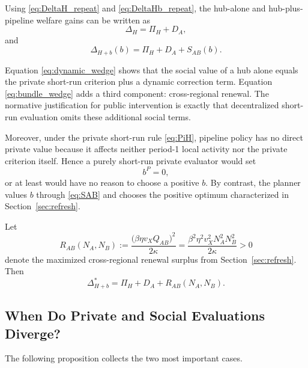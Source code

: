 Using \eqref{eq:DeltaH_repeat} and \eqref{eq:DeltaHb_repeat}, the hub-alone and hub-plus-pipeline welfare gains can be written as
\begin{equation}
\Delta_H
=
\Pi_H + D_A,
\label{eq:dynamic_wedge}
\end{equation}
and
\begin{equation}
\Delta_{H+b}(b)
=
\Pi_H + D_A + S_{AB}(b).
\label{eq:bundle_wedge}
\end{equation}

Equation \eqref{eq:dynamic_wedge} shows that the social value of a hub alone equals the private short-run criterion plus a dynamic correction term. Equation \eqref{eq:bundle_wedge} adds a third component: cross-regional renewal. The normative justification for public intervention is exactly that decentralized short-run evaluation omits these additional social terms.

Moreover, under the private short-run rule \eqref{eq:PiH}, pipeline policy has no direct private value because it affects neither period-1 local activity nor the private criterion itself. Hence a purely short-run private evaluator would set
\[
b^{P}=0,
\]
or at least would have no reason to choose a positive $b$. By contrast, the planner values $b$ through \eqref{eq:SAB} and chooses the positive optimum characterized in Section~\ref{sec:refresh}.

Let
\begin{equation}
R_{AB}(N_A,N_B)
:=
\frac{\bigl(\beta\eta v_X Q_{AB}\bigr)^2}{2\kappa}
=
\frac{\beta^2\eta^2 v_X^2 N_A^2N_B^2}{2\kappa}
>0
\label{eq:RAB_sec5}
\end{equation}
denote the maximized cross-regional renewal surplus from Section~\ref{sec:refresh}. Then
\begin{equation}
\Delta_{H+b}^*
=
\Pi_H + D_A + R_{AB}(N_A,N_B).
\label{eq:bundle_wedge_star}
\end{equation}

\subsection{When Do Private and Social Evaluations Diverge?}

The following proposition collects the two most important cases.

